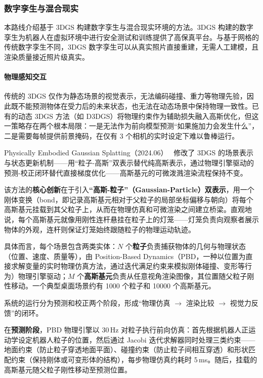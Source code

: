\subsubsection{数字孪生与混合现实}

本路线介绍基于 3DGS 构建数字孪生与混合现实环境的方法。3DGS 构建的数字孪生为机器人在虚拟环境中进行安全测试和训练提供了高保真平台。与基于网格的传统数字孪生不同，3DGS 数字孪生可以从真实照片直接重建，无需人工建模，且渲染质量接近照片级真实。

\paragraph{物理感知交互}

传统的 3DGS 仅作为静态场景的视觉表示，无法编码碰撞、重力等物理先验，因此既不能预测物体在受力后的未来状态，也无法在动态场景中保持物理一致性。已有的动态 3DGS 方法（如 D3DGS）将物理约束作为辅助损失融入高斯优化，但这一策略存在两个根本局限：一是无法作为前向模型预测``如果施加力会发生什么''，二是需要每帧提供前景掩码，在仅有 3 个相机的实时设定下难以鲁棒运行。

Physically Embodied Gaussian Splatting（2024.06）~\cite{2406_10788} 修改了 3DGS 的场景表示与状态更新机制——用``粒子-高斯''双表示替代纯高斯表示，通过物理引擎驱动的预测-校正闭环替代直接梯度优化——高斯基元的可微泼溅渲染流程保持不变。

该方法的\textbf{核心创新}在于引入\textbf{``高斯-粒子''（Gaussian-Particle）双表示}，用一个刚体变换（bond，即记录高斯基元相对于父粒子的局部坐标偏移与朝向）将每个高斯基元挂载到其父粒子上，从而在物理仿真和可微渲染之间建立桥梁。直观地说，每个高斯基元就像用刚性连杆悬挂在粒子上的灯笼——灯笼负责向观察者展示物体的外观，连杆则保证灯笼始终跟随粒子的物理运动轨迹。

具体而言，每个场景包含两类实体：$N$ 个\textbf{粒子}负责捕获物体的几何与物理状态（位置、速度、质量等），由 Position-Based Dynamics（PBD，一种以位置为直接求解变量的实时物理仿真方法，通过迭代满足约束来模拟刚体碰撞、变形等行为）物理引擎驱动；$M$ 个\textbf{高斯基元}负责从任意视角渲染图像，其位置随父粒子刚性移动。一个典型桌面场景约有 1000 个粒子和 10000 个高斯基元。

系统的运行分为预测和校正两个阶段，形成``物理仿真 $\to$ 渲染比较 $\to$ 视觉力反馈''的闭环。

在\textbf{预测阶段}，PBD 物理引擎以 30\,Hz 对粒子执行前向仿真：首先根据机器人正运动学设定机器人粒子的位置，然后通过 Jacobi 迭代求解器同时处理三类约束——地面约束（防止粒子穿透地面平面）、碰撞约束（防止粒子间相互穿透）和形状匹配约束（保持刚体或可变形体的结构），每步物理仿真约耗时 5\,ms。随后，挂载的高斯基元随父粒子刚性移动至预测位置。

